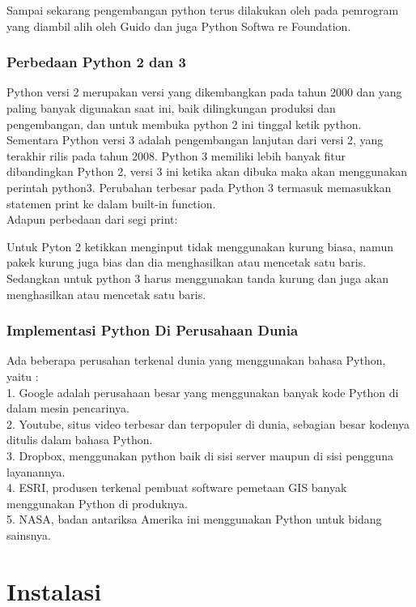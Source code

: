 Sampai sekarang pengembangan python terus dilakukan oleh pada pemrogram yang diambil alih oleh  Guido dan juga Python Softwa
re Foundation. 

\subsubsection{Perbedaan Python 2 dan 3}

Python versi 2 merupakan versi yang dikembangkan pada tahun 2000 dan yang paling banyak digunakan saat ini, baik dilingkungan produksi dan pengembangan, dan untuk membuka python 2 ini tinggal ketik python.\\
 
Sementara Python versi 3 adalah pengembangan lanjutan dari versi 2, yang terakhir rilis pada tahun 2008. Python 3 memiliki lebih banyak fitur dibandingkan Python 2, versi 3 ini ketika akan dibuka maka akan menggunakan perintah python3. Perubahan terbesar pada Python 3 termasuk memasukkan statemen print ke dalam built-in function.\\

Adapun perbedaan dari segi print:

Untuk Pyton 2 ketikkan menginput tidak menggunakan kurung biasa, namun pakek kurung juga bias dan dia menghasilkan atau mencetak satu baris. Sedangkan untuk python 3 harus menggunakan tanda kurung dan juga akan menghasilkan atau mencetak satu baris.\\

\subsubsection{Implementasi Python Di Perusahaan Dunia}

Ada beberapa perusahan terkenal dunia yang menggunakan bahasa Python, yaitu :\\
1. Google adalah perusahaan besar yang menggunakan banyak kode Python di dalam mesin pencarinya.\\
2. Youtube, situs video terbesar dan terpopuler di dunia, sebagian besar kodenya ditulis dalam bahasa Python.\\
3. Dropbox, menggunakan python baik di sisi server maupun di sisi pengguna layanannya.\\
4. ESRI, produsen terkenal pembuat software pemetaan GIS banyak menggunakan Python di produknya.\\
5. NASA, badan antariksa Amerika ini menggunakan Python untuk bidang sainsnya.
\section{Instalasi}
